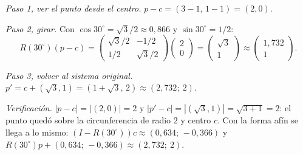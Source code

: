\begin{center}
\end{center}

\begin{ejemplo}[Rotar \(p=(3,1)\) un ángulo de \(30^\circ\) alrededor de \(c=(1,1)\)]\label{ej:rot30}
\emph{Paso 1, ver el punto desde el centro.} \(p-c=(3-1,\,1-1)=(2,0)\).

\emph{Paso 2, girar.} Con \(\cos30^\circ=\sqrt3/2\approx0{,}866\) y \(\sin30^\circ=1/2\):
\[
R(30^\circ)(p-c)=
\begin{pmatrix}\sqrt3/2&-1/2\\[2pt]1/2&\sqrt3/2\end{pmatrix}
\begin{pmatrix}2\\0\end{pmatrix}
=\begin{pmatrix}\sqrt3\\1\end{pmatrix}
\approx\begin{pmatrix}1{,}732\\1\end{pmatrix}.
\]

\emph{Paso 3, volver al sistema original.}
\(p'=c+(\sqrt3,1)=(1+\sqrt3,\,2)\approx(2{,}732;\ 2)\).

\emph{Verificación.} \(|p-c|=|(2,0)|=2\) y \(|p'-c|=|(\sqrt3,1)|=\sqrt{3+1}=2\): el punto
quedó sobre la circunferencia de radio \(2\) y centro \(c\). Con la forma afín se llega a lo
mismo: \((I-R(30^\circ))c\approx(0{,}634;\,-0{,}366)\) y
\(R(30^\circ)p+(0{,}634;\,-0{,}366)\approx(2{,}732;\ 2)\).


\end{ejemplo}
